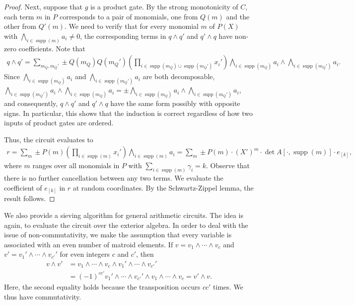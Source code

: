 \documentclass{theoretics}
\DeclareMathOperator{\supp}{supp}
\begin{document}
\begin{proof}
  Next, suppose that $g$ is a product gate.
  By the strong monotonicity of $C$, each term $m$ in $P$ corresponds to a pair of monomials, one from $Q(m)$ and the other from $Q'(m)$.
  We need to verify that for every monomial $m$ of $P(X)$ with $\bigwedge_{i \in \supp(m)} a_i \ne 0$, the corresponding terms in $q \wedge q'$ and $q' \wedge q$ have non-zero coefficients.
  Note that
  \begin{align*}
    q \wedge q' = 
    \sum_{m_Q, m_Q'} \pm Q(m_Q) Q(m_Q') \left(\prod_{i \in \supp(m_Q) \cup \supp(m_Q')} x_i'\right) \bigwedge_{i \in \supp(m_Q)} a_i \wedge \bigwedge_{i \in \supp(m_Q')} a_i.
  \end{align*}
  Since $\bigwedge_{i \in \supp(m_Q)} a_i$ and $\bigwedge_{i \in \supp(m_Q')} a_i$ are both decomposable, $\bigwedge_{i \in \supp(m_Q')} a_i \wedge \bigwedge_{i \in \supp(m_Q)} a_i = \pm \bigwedge_{i \in \supp(m_Q)} a_i \wedge \bigwedge_{i \in \supp(m_Q')}a_i$, and consequently, $q \wedge q'$ and $q' \wedge q$ have the same form possibly with opposite signs.
  In particular, this shows that the induction is correct regardless of how two inputs of product gates are ordered. 

  Thus, the circuit evaluates to
  \begin{align*}
    r = \sum_{m} \pm P(m) \left(\prod_{i \in \supp(m)} x_i'\right) \bigwedge_{i \in \supp(m)} a_i
    = \sum_{m} \pm P(m) \cdot (X')^{m} \cdot \det A[\cdot, \supp(m)] \cdot e_{[k]},
  \end{align*}
  where $m$ ranges over all monomials in $P$ with $\sum_{i \in \supp(m)} \gamma_i = k$.
  Observe that there is no further cancellation between any two terms.
  We evaluate the coefficient of $e_{[k]}$ in $r$ at random coordinates.
  By the Schwartz-Zippel lemma, the result follows.
\end{proof}

We also provide a sieving algorithm for general arithmetic circuits.
The idea is again, to evaluate the circuit over the exterior algebra.
In order to deal with the issue of non-commutativity, we make the assumption that every variable is associated with an even number of matroid elements.
If $v = v_1 \wedge \cdots \wedge v_c$ and $v' = v_1' \wedge \cdots \wedge v_{c'}'$ for even integers $c$ and $c'$, then
\begin{align*}
  v \wedge v'
  &= v_1 \wedge \cdots \wedge v_c \wedge v_1' \wedge \cdots \wedge v_{c'}' \\
  &= (-1)^{cc'} v_1' \wedge \cdots \wedge v_{c'}' \wedge v_1 \wedge \cdots \wedge v_{c} = v' \wedge v.
\end{align*}
Here, the second equality holds because the transposition occurs $cc'$ times.
We thus have commutativity.
 
\end{document}
